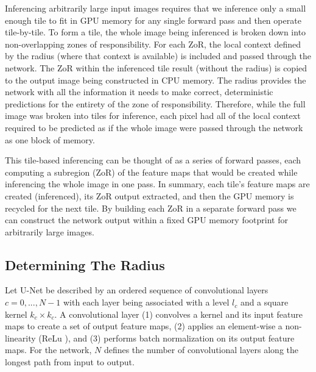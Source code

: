 \documentclass[runningheads]{llncs}
\begin{document}
Inferencing arbitrarily large input images requires that we inference only a small enough tile to fit in GPU memory for any single forward pass and then operate tile-by-tile. To form a tile, the whole image being inferenced is broken down into non-overlapping zones of responsibility. For each ZoR, the local context defined by the radius (where that context is available) is included and passed through the network. The ZoR within the inferenced tile result (without the radius) is copied to the output image being constructed in CPU memory. The radius provides the network with all the information it needs to make correct, deterministic predictions for the entirety of the zone of responsibility. 
Therefore, while the full image was broken into tiles for inference, each pixel had all of the local context required to be predicted as if the whole image were passed through the network as one block of memory. 

This tile-based inferencing can be thought of as a series of forward passes, each computing a subregion (ZoR) of the feature maps that would be created while inferencing the whole image in one pass. 
In summary, each tile's feature maps are created (inferenced), its ZoR output extracted, and then the GPU memory is recycled for the next tile. By building each ZoR in a separate forward pass we can construct the network output within a fixed GPU memory footprint for arbitrarily large images. 


\subsection{Determining The Radius}


Let U-Net be described by an ordered sequence of convolutional layers $c={0, ..., N-1}$ with each layer being associated with a level $l_{c}$ and a square kernel $k_{c} \times k_{c}$. 
A convolutional layer (1) convolves a kernel and its input feature maps to create a set of output feature maps, (2) applies an element-wise a non-linearity (ReLu \cite{lecun2015deep}), and (3) performs batch normalization \cite{ioffe2015batch} on its output feature maps.
For the network, $N$ defines the number of convolutional layers along the longest path from input to output. 
\end{document}
